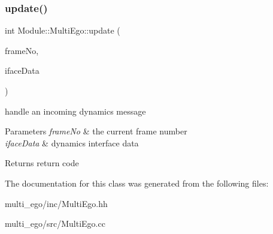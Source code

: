 \subsubsection{\texorpdfstring{update()}{update()}}
{\footnotesize\ttfamily int Module\+::\+Multi\+Ego\+::update (\begin{DoxyParamCaption}\item[{const unsigned long \&}]{frame\+No,  }\item[{Dynamics\+Iface $\ast$}]{iface\+Data }\end{DoxyParamCaption})\hspace{0.3cm}{\ttfamily [virtual]}}

handle an incoming dynamics message 
\begin{DoxyParams}{Parameters}
{\em frame\+No} & the current frame number \\
\hline
{\em iface\+Data} & dynamics interface data \\
\hline
\end{DoxyParams}
\begin{DoxyReturn}{Returns}
return code 
\end{DoxyReturn}


The documentation for this class was generated from the following files\+:\begin{DoxyCompactItemize}
\item 
multi\+\_\+ego/inc/Multi\+Ego.\+hh\item 
multi\+\_\+ego/src/Multi\+Ego.\+cc\end{DoxyCompactItemize}
